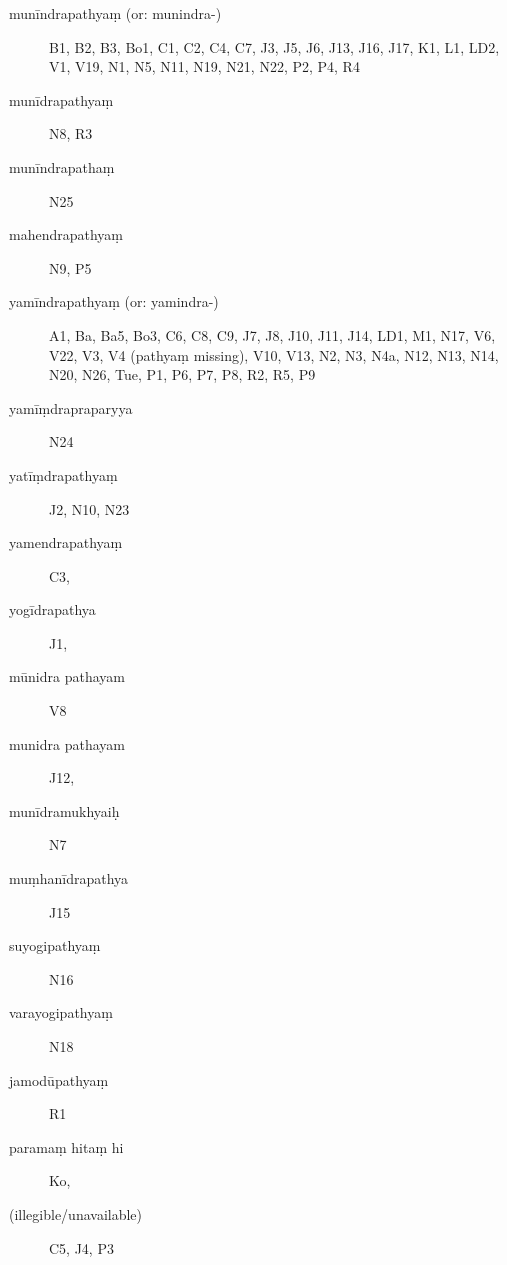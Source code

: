\begin{ekdosis}
\begin{marma}[hp01_055]
\begin{marma}[hp01_062]
      \begin{description}
      \item[munīndrapathyaṃ (or: munindra-)] B1, B2, B3, Bo1, C1, C2, C4, C7, J3, J5, J6, J13, J16, J17, K1, L1, LD2, V1, V19, N1, N5, N11, N19, N21, N22, P2, P4, R4
      \item[munīdrapathyaṃ]   N8, R3
      \item[munīndrapathaṃ]   N25
      \item[mahendrapathyaṃ]  N9, P5
      \item[yamīndrapathyaṃ (or: yamindra-)] A1, Ba, Ba5, Bo3, C6, C8, C9, J7, J8, J10, J11, J14, LD1, M1, N17, V6, V22, V3, V4 (pathyaṃ missing), V10, V13, N2, N3, N4a, N12, N13, N14, N20, N26, Tue, P1, P6, P7, P8, R2, R5, P9
      \item[yamīṃdrapraparyya]   N24
      \item[yatīṃdrapathyaṃ]        J2, N10, N23
      \item[yamendrapathyaṃ]        C3,
      \item[yogīdrapathya]        J1,         
      \item[mūnidra pathayam]        V8
      \item[munidra pathayam]        J12,
      \item[munīdramukhyaiḥ]        N7
      \item[muṃhanīdrapathya]        J15
      \item[suyogipathyaṃ]         N16
      \item[varayogipathyaṃ]        N18
      \item[jamodūpathyaṃ]        R1
      \item[paramaṃ hitaṃ hi]        Ko,
      \item[(illegible/unavailable)]   C5, J4, P3
      \end{description}
    \end{marma}



\end{marma}
\end{ekdosis}
